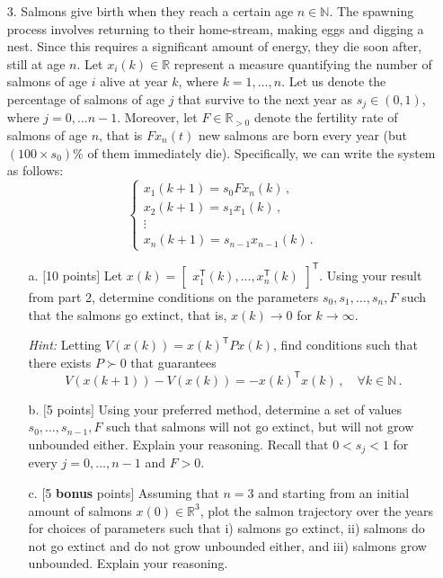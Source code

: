 \documentclass[a4paper,10.5pt]{article}
\begin{document}
\begin{itemize}
\item[3.]  Salmons give birth when they reach a certain age $n \in \mathbb{N}$. The spawning process involves returning to their home-stream, making eggs and digging a nest. Since this requires a significant amount of energy, they die soon after, still at age $n$. Let $x_i(k)\in \mathbb{R}$ represent a measure quantifying the number of salmons of age $i$  alive at year $k$, where $k=1,\ldots,n$.  Let us denote the percentage of salmons of age $j$ that survive to the next year as $s_j \in (0,1)$, where $j=0,\ldots n-1$. Moreover, let $F\in \mathbb{R}_{>0}$ denote the fertility rate of salmons of age $n$, that is $Fx_n(t)$ new salmons are born every year (but $(100 \times s_0) \%$ of them immediately die). Specifically, we can write the system as follows:
\begin{equation*}
\begin{cases}
x_1(k+1)=s_0Fx_n(k)\,,\\
x_2(k+1)=s_1x_1(k)\,,\\
\vdots\\
x_n(k+1)=s_{n-1}x_{n-1}(k)\,.
\end{cases}
\end{equation*}
\begin{itemize}
\item[a.] $[$10 points$]$ Let $x(k)=\begin{bmatrix}x_1^\mathsf{T}(k),\ldots,x_n^\mathsf{T}(k)\end{bmatrix}^\mathsf{T}$. Using your result from part 2, determine conditions on the parameters $s_0,s_1,\ldots,s_n,F$ such that the salmons  go extinct, that is, $x(k)\rightarrow 0$ for $k\rightarrow \infty$. 

{\em Hint:} Letting $V(x(k))=x(k)^\mathsf{T}Px(k)$, find conditions such that there exists $P\succ 0$ that guarantees $$V(x(k+1)) - V(x(k))=-x(k)^\mathsf{T}x(k)\,, \quad \forall k \in \mathbb{N}\,.$$

\item[b.] $[$5 points$]$ Using your preferred method, determine a set of values $s_0,\ldots,s_{n-1},F$ such that salmons will not go extinct, but will not grow unbounded either. Explain your reasoning. Recall that  $0<s_j<1$ for every $j=0,\ldots,n-1$ and $F>0$.

\item[c.] $[$5 \textbf{bonus} points$]$ Assuming that $n=3$ and starting from an initial amount of salmons $x(0) \in \mathbb{R}^{3}$, plot the salmon trajectory over the years for choices of parameters such that i) salmons go extinct, ii) salmons do not go extinct and do not grow unbounded either, and iii) salmons grow unbounded. Explain your reasoning. 

\end{itemize}
\end{itemize}
\end{document}
